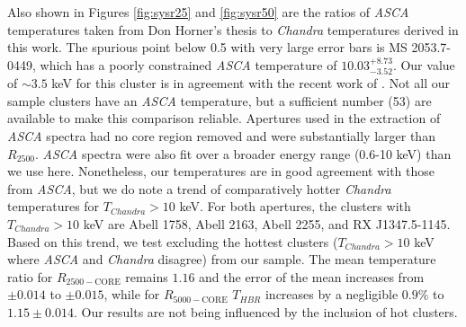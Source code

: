 \documentclass[12pt,preprint]{aastex}
\begin{document}
Also shown in Figures \ref{fig:sysr25} and \ref{fig:sysr50} are the
ratios of {\it ASCA} temperatures taken from Don Horner's thesis to
{\it Chandra} temperatures derived in this work. The spurious point
below 0.5 with very large error bars is MS 2053.7-0449, which has a
poorly constrained {\it ASCA} temperature of
$10.03^{+8.73}_{-3.52}$. Our value of $\sim 3.5$ keV for this cluster
is in agreement with the recent work of
\cite{2007astro.ph..3156M}. Not all our sample clusters have an {\it
ASCA} temperature, but a sufficient number (53) are available to make
this comparison reliable. Apertures used in the extraction of {\it
ASCA} spectra had no core region removed and were substantially larger
than $R_{2500}$. {\it ASCA} spectra were also fit over a broader
energy range (0.6-10 keV) than we use here. Nonetheless, our
temperatures are in good agreement with those from {\it ASCA}, but we
do note a trend of comparatively hotter {\it Chandra} temperatures for
$T_{Chandra} > 10$ keV. For both apertures, the clusters with
$T_{Chandra} > 10$ keV are Abell 1758, Abell 2163, Abell 2255, and RX
J1347.5-1145. Based on this trend, we test excluding the hottest
clusters ($T_{Chandra} > 10$ keV where {\it ASCA} and {\it Chandra}
disagree) from our sample. The mean temperature ratio for
$R_{2500-\mathrm{CORE}}$ remains $1.16$ and the error of the mean
increases from $\pm 0.014$ to $\pm 0.015$, while for
$R_{5000-\mathrm{CORE}}$ $T_{HBR}$ increases by a negligible $0.9\%$
to $1.15\pm 0.014$. Our results are not being influenced by the
inclusion of hot clusters.
\end{document}
